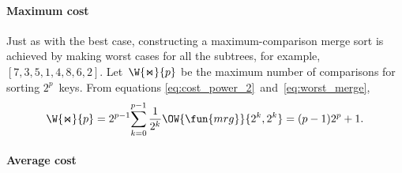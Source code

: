 \paragraph{Maximum cost}

Just as with the best case, constructing a maximum\hyp{}comparison
merge sort is achieved by making worst cases for all the subtrees, for
example, \([7,3,5,1,4,8,6,2]\). Let~\(\W{\Join}{p}\) be the maximum
number of comparisons for sorting \(2^p\)~keys. From equations
\eqref{eq:cost_power_2}~and~\eqref{eq:worst_merge},
\begin{equation}
\belowdisplayskip=0pt
\W{\Join}{p}
  = 2^{p-1}\!\sum_{k=0}^{p-1}{\frac{1}{2^k}\OW{\fun{mrg}}{2^k,2^k}}
  = (p-1)2^p + 1.
\label{eq:worst_power}\index{mrg@$\W{\Join}{n}$}
\end{equation}

\paragraph{Average cost}
\label{par:Atms_2p}

